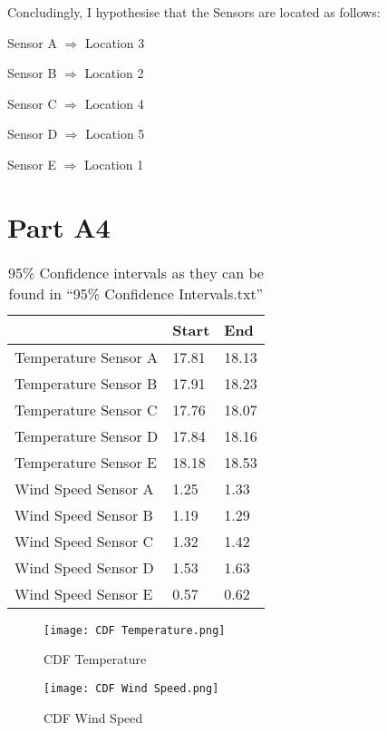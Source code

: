 \documentclass{article}
\begin{document}
\noindent Concludingly, I hypothesise that the Sensors are located as follows:

\begin{center}
Sensor A $\Rightarrow$ Location 3

Sensor B $\Rightarrow$ Location 2

Sensor C $\Rightarrow$ Location 4

Sensor D $\Rightarrow$ Location 5

Sensor E $\Rightarrow$ Location 1
\end{center}

\section{Part A4}

\begin{table}[H]
\centering
\begin{tabular}{l|ll}
                       & Start  & End    \\ \hline
Temperature   Sensor A & 17.81 & 18.13 \\
Temperature   Sensor B & 17.91 & 18.23 \\
Temperature   Sensor C & 17.76 & 18.07 \\
Temperature   Sensor D & 17.84 & 18.16 \\
Temperature   Sensor E & 18.18 & 18.53 \\
Wind   Speed Sensor A  & 1.25  & 1.33  \\
Wind   Speed Sensor B  & 1.19  & 1.29  \\
Wind   Speed Sensor C  & 1.32  & 1.42  \\
Wind   Speed Sensor D  & 1.53   & 1.63  \\
Wind   Speed Sensor E  & 0.57  & 0.62 
\end{tabular}
\caption{95\% Confidence intervals as they can be found in “95\% Confidence Intervals.txt”}
\label{tab:my-table}
\end{table}

\begin{figure} [H]
  \texttt{[image: CDF Temperature.png]}
  \caption{CDF Temperature}
  \label{fig:CDF_temp}
\end{figure}

\begin{figure} [H]
  \texttt{[image: CDF Wind Speed.png]}
  \caption{CDF Wind Speed}
  \label{fig:CDF_ws}
\end{figure}
\end{document}
